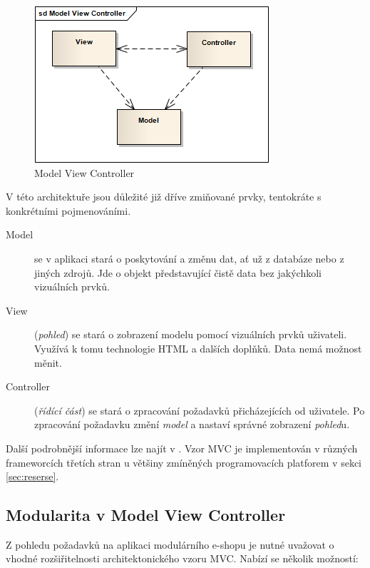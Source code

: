 \documentclass[11pt,twoside,a4paper]{book}
\begin{document}
\begin{figure}[h!]
\begin{center}
\includegraphics[scale=0.75]{figures/mvc}
\caption{Model View Controller}
\label{fig:mvc}
\end{center}
\end{figure}

V této architektuře jsou důležité již dříve zmiňované prvky, tentokráte s konkrétními pojmenováními.

\begin{description}
\item[Model] se v aplikaci stará o poskytování a změnu dat, ať už z databáze nebo z jiných zdrojů. Jde o objekt představující čistě data bez jakýchkoli vizuálních prvků.
\item[View] (\textit{pohled}) se stará o zobrazení modelu pomocí vizuálních prvků uživateli. Využívá k tomu technologie HTML a dalších doplňků. Data nemá možnost měnit.
\item[Controller] (\textit{řídící část}) se stará o zpracování požadavků přicházejících od uživatele. Po zpracování požadavku změní \textit{model} a nastaví správné zobrazení \textit{pohled}u.
\end{description}

Další podrobnější informace lze najít v \citep{PEAA}. Vzor MVC je implementován v různých frameworcích třetích stran u většiny zmíněných programovacích platforem v sekci \ref{sec:reserse}.

\subsection{Modularita v Model View Controller}

Z pohledu požadavků na aplikaci modulárního e-shopu je nutné uvažovat o vhodné rozšiřitelnosti architektonického vzoru MVC. Nabízí se několik možností:
\end{document}
